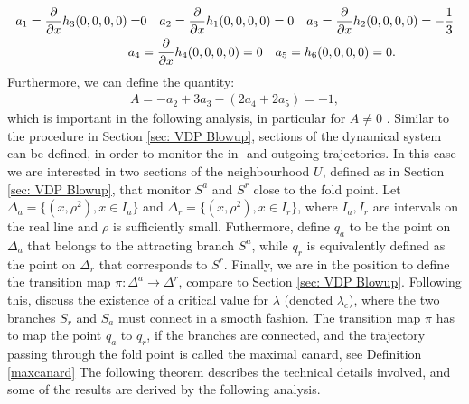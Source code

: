 \begin{align*}
a_1=\pd{}{x}h_3(0,0,0,0)=& 0 \ \ \
a_2=\pd{}{x}h_1(0,0,0,0)= 0\ \ \ 
a_3=\pd{}{x}h_2(0,0,0,0)=-\frac{1}{3}\\
a_4&=\pd{}{x}h_4(0,0,0,0)=0\ \ \
a_5=h_6(0,0,0,0)=0.
\end{align*}
Furthermore, we can define the quantity:
\begin{align*}
A=-a_2+3a_3-(2a_4+2a_5)=-1,
\end{align*}
which is important in the following analysis, in particular for $A \neq 0$ \citep{krupa2001}. 
Similar to the procedure in Section \ref{sec: VDP Blowup}, sections of the dynamical system can be defined, in order to monitor the in- and outgoing trajectories. In this case we are interested in two sections of the neighbourhood $U$, defined as in Section \ref{sec: VDP Blowup}, that monitor $S^a$ and $S^r$ close to the fold point.
Let $ \Delta_a = \{ (x,\rho^2), x \in  I_a \}$ and $\Delta_r= \{ (x,\rho^2), x \in  I_r \}$, where $I_a,I_r$ are intervals on the real line and $\rho$ is sufficiently small.
Futhermore, define $q_a$ to be the point on $\Delta_a$ that belongs to the attracting branch $S^a$, while $q_r$ is equivalently defined as the point on $\Delta_r$ that corresponds to $S^r$. Finally, we are in the position to define the transition map $\pi: \Delta^a \to \Delta^r$, compare to Section \ref{sec: VDP Blowup}.
Following this, \citet{krupa2001} discuss the existence of a critical value for $\lambda$ (denoted $\lambda_c$), where the two branches $S_r$ and $S_a$ must connect in a smooth fashion.  
The transition map $\pi$ has to map the point $q_a$ to $q_r$, if the branches are connected, and the trajectory passing through the fold point is called the maximal canard, see Definition \ref{maxcanard}
The following theorem describes the technical details involved, and some of the results are derived by the following analysis.
